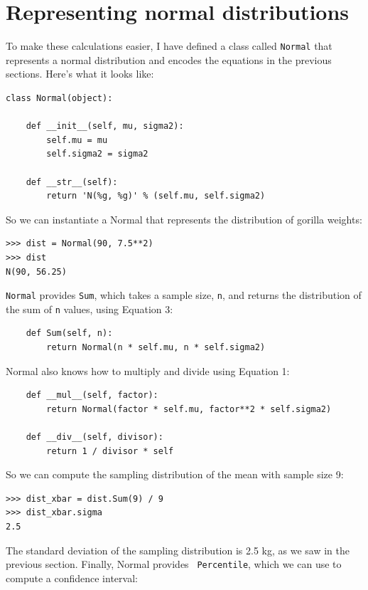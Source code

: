 \documentclass[12pt]{book}
\theoremstyle{exercise}
\begin{document}
\section{Representing normal distributions}

To make these calculations easier, I have defined a class called
{\tt Normal} that represents a normal distribution and encodes
the equations in the previous sections.  Here's what it looks
like:%

\begin{verbatim}
class Normal(object):

    def __init__(self, mu, sigma2):
        self.mu = mu
        self.sigma2 = sigma2

    def __str__(self):
        return 'N(%g, %g)' % (self.mu, self.sigma2)
\end{verbatim}

So we can instantiate a Normal that represents the distribution
of gorilla weights:%

\begin{verbatim}
>>> dist = Normal(90, 7.5**2)
>>> dist
N(90, 56.25)
\end{verbatim}

{\tt Normal} provides {\tt Sum}, which takes a sample size, {\tt n},
and returns the distribution of the sum of {\tt n} values, using
Equation 3:

\begin{verbatim}
    def Sum(self, n):
        return Normal(n * self.mu, n * self.sigma2)
\end{verbatim}

Normal also knows how to multiply and divide using
Equation 1:

\begin{verbatim}
    def __mul__(self, factor):
        return Normal(factor * self.mu, factor**2 * self.sigma2)

    def __div__(self, divisor):
        return 1 / divisor * self
\end{verbatim}

So we can compute the sampling distribution of the mean with sample
size 9:%
%

\begin{verbatim}
>>> dist_xbar = dist.Sum(9) / 9
>>> dist_xbar.sigma
2.5
\end{verbatim}

The standard deviation of the sampling distribution is 2.5 kg, as we
saw in the previous section.  Finally, Normal provides {\tt
  Percentile}, which we can use to compute a confidence interval:%
%
\end{document}
